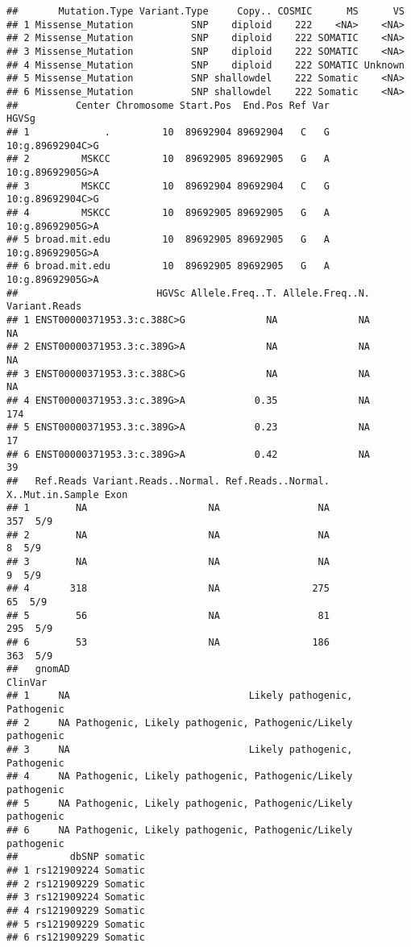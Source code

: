 \documentclass[
]{article}
\begin{document}
\begin{verbatim}
##       Mutation.Type Variant.Type     Copy.. COSMIC      MS      VS
## 1 Missense_Mutation          SNP    diploid    222    <NA>    <NA>
## 2 Missense_Mutation          SNP    diploid    222 SOMATIC    <NA>
## 3 Missense_Mutation          SNP    diploid    222 SOMATIC    <NA>
## 4 Missense_Mutation          SNP    diploid    222 SOMATIC Unknown
## 5 Missense_Mutation          SNP shallowdel    222 Somatic    <NA>
## 6 Missense_Mutation          SNP shallowdel    222 Somatic    <NA>
##          Center Chromosome Start.Pos  End.Pos Ref Var            HGVSg
## 1             .         10  89692904 89692904   C   G 10:g.89692904C>G
## 2         MSKCC         10  89692905 89692905   G   A 10:g.89692905G>A
## 3         MSKCC         10  89692904 89692904   C   G 10:g.89692904C>G
## 4         MSKCC         10  89692905 89692905   G   A 10:g.89692905G>A
## 5 broad.mit.edu         10  89692905 89692905   G   A 10:g.89692905G>A
## 6 broad.mit.edu         10  89692905 89692905   G   A 10:g.89692905G>A
##                        HGVSc Allele.Freq..T. Allele.Freq..N. Variant.Reads
## 1 ENST00000371953.3:c.388C>G              NA              NA            NA
## 2 ENST00000371953.3:c.389G>A              NA              NA            NA
## 3 ENST00000371953.3:c.388C>G              NA              NA            NA
## 4 ENST00000371953.3:c.389G>A            0.35              NA           174
## 5 ENST00000371953.3:c.389G>A            0.23              NA            17
## 6 ENST00000371953.3:c.389G>A            0.42              NA            39
##   Ref.Reads Variant.Reads..Normal. Ref.Reads..Normal. X..Mut.in.Sample Exon
## 1        NA                     NA                 NA              357  5/9
## 2        NA                     NA                 NA                8  5/9
## 3        NA                     NA                 NA                9  5/9
## 4       318                     NA                275               65  5/9
## 5        56                     NA                 81              295  5/9
## 6        53                     NA                186              363  5/9
##   gnomAD                                                     ClinVar
## 1     NA                               Likely pathogenic, Pathogenic
## 2     NA Pathogenic, Likely pathogenic, Pathogenic/Likely pathogenic
## 3     NA                               Likely pathogenic, Pathogenic
## 4     NA Pathogenic, Likely pathogenic, Pathogenic/Likely pathogenic
## 5     NA Pathogenic, Likely pathogenic, Pathogenic/Likely pathogenic
## 6     NA Pathogenic, Likely pathogenic, Pathogenic/Likely pathogenic
##         dbSNP somatic
## 1 rs121909224 Somatic
## 2 rs121909229 Somatic
## 3 rs121909224 Somatic
## 4 rs121909229 Somatic
## 5 rs121909229 Somatic
## 6 rs121909229 Somatic
\end{verbatim}
\end{document}

